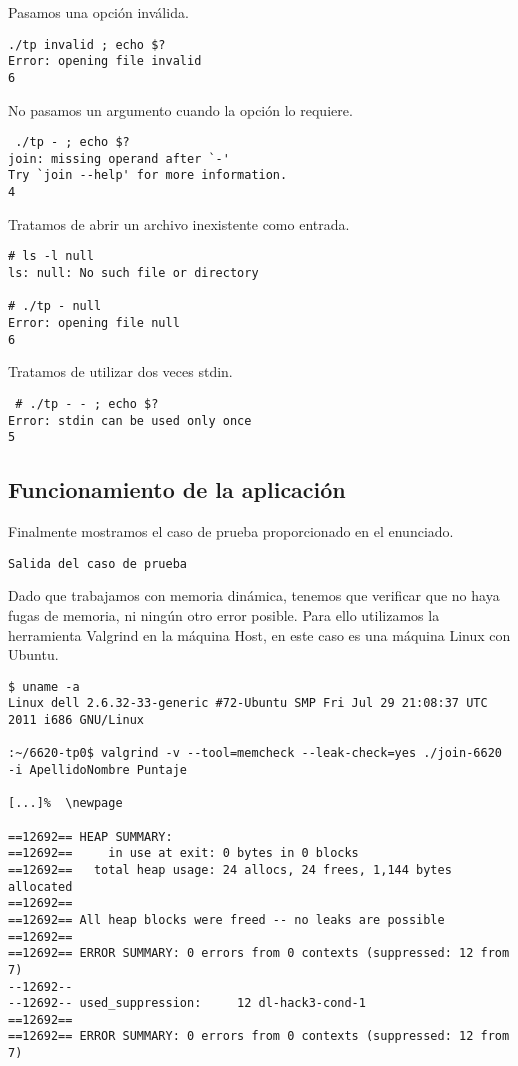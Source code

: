\documentclass[a4paper, 10pt, twoside, notitlepage]{article}
\begin{document}
Pasamos una opción inválida.
\scriptsize
\begin{verbatim}
./tp invalid ; echo $?
Error: opening file invalid
6
\end{verbatim}
\normalsize

No pasamos un argumento cuando la opción lo requiere.
\scriptsize
\begin{verbatim}
 ./tp - ; echo $?
join: missing operand after `-'
Try `join --help' for more information.
4
\end{verbatim}
\normalsize

Tratamos de abrir un archivo inexistente como entrada.
\scriptsize
\begin{verbatim}
# ls -l null
ls: null: No such file or directory

# ./tp - null
Error: opening file null
6
\end{verbatim}
\normalsize

Tratamos de utilizar dos veces stdin.
\scriptsize
\begin{verbatim}
 # ./tp - - ; echo $?
Error: stdin can be used only once
5
\end{verbatim}
\normalsize


\subsection{Funcionamiento de la aplicación}


Finalmente mostramos el caso de prueba proporcionado en el enunciado.
\scriptsize
\begin{verbatim}
Salida del caso de prueba
\end{verbatim}
\normalsize

Dado que trabajamos con memoria dinámica, tenemos que verificar que no haya fugas de memoria, ni ningún otro error posible. Para ello utilizamos la herramienta Valgrind en la máquina Host, en este caso es una máquina Linux con Ubuntu.

\scriptsize
\begin{verbatim}
$ uname -a
Linux dell 2.6.32-33-generic #72-Ubuntu SMP Fri Jul 29 21:08:37 UTC 2011 i686 GNU/Linux

:~/6620-tp0$ valgrind -v --tool=memcheck --leak-check=yes ./join-6620 -i ApellidoNombre Puntaje

[...]%  \newpage

==12692== HEAP SUMMARY:
==12692==     in use at exit: 0 bytes in 0 blocks
==12692==   total heap usage: 24 allocs, 24 frees, 1,144 bytes allocated
==12692== 
==12692== All heap blocks were freed -- no leaks are possible
==12692== 
==12692== ERROR SUMMARY: 0 errors from 0 contexts (suppressed: 12 from 7)
--12692-- 
--12692-- used_suppression:     12 dl-hack3-cond-1
==12692== 
==12692== ERROR SUMMARY: 0 errors from 0 contexts (suppressed: 12 from 7)

\end{verbatim}
\normalsize
\end{document}
